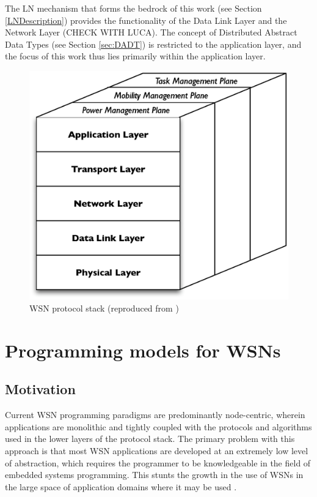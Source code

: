 The LN mechanism that forms the bedrock of this work (see 
Section \ref{LNDescription}) provides the functionality of the Data Link Layer 
and the Network Layer (CHECK WITH LUCA). The concept of Distributed Abstract
Data Types (see Section \ref{sec:DADT}) is restricted to the application layer,
and the focus of this work thus lies primarily within the application layer.

\begin{figure}
\centering
\label{Fig:ProtStack}
\includegraphics[scale=0.6]{img/ProtStack.eps}\caption[WSN protocol stack]{WSN protocol
stack (reproduced from \cite{SensorSurveyAkyildiz:2002})}
\end{figure}

\section {Programming models for WSNs}

\subsection{Motivation}
Current WSN programming paradigms are predominantly node-centric, wherein
applications are monolithic and tightly coupled with the protocols and algorithms
used in the lower layers of the protocol stack. The primary problem with this
approach is that most WSN applications are developed at an extremely low level of
abstraction, which requires the programmer to be knowledgeable in the field of
embedded systems programming. This stunts the growth in the use of WSNs in the
large space of application domains where it may be used
\cite{mottola_middleware:2008}.

